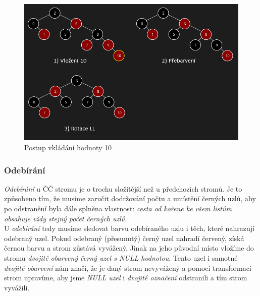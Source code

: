 \documentclass[
  biblatex=false,
  font=serif,
  glossaries=false,
  tables=false,
  theorems=false,
  index
]{kidiplom}
\begin{document}
\begin{figure}[h!]
\centering
	\includegraphics[scale=0.57]{obrazky/24CCVlozeni.png}
	\caption{Postup vkládání hodnoty 10}
\end{figure}

\subsubsection{Odebírání}
\indent\indent \textit{Odebírání} u ČČ stromu je o trochu složitější než u předchozích stromů. Je to způsobeno tím, že musíme zaručit dodržování počtu a umístění černých uzlů, aby po odstranění byla dále splněna vlastnost: \textit{cesta od kořene ke všem listům obsahuje vždy stejný počet černých uzlů.}\\
\indent U \textit{odebírání} tedy musíme sledovat barvu odebíraného uzlu i těch, které nahrazují odebraný uzel. Pokud odebraný (přesunutý) černý uzel nahradí červený, získá černou barvu a strom zůstává vyvážený. Jinak na jeho původní místo vložíme do stromu \textit{dvojitě obarvený černý uzel s NULL hodnotou}. Tento uzel i samotné \textit{dvojité obarvení} nám značí, že je daný strom nevyvážený a pomocí transformací strom upravíme, aby jsme \textit{NULL uzel} i \textit{dvojité označení} odstranili a tím strom vyvážili.\\
\end{document}
